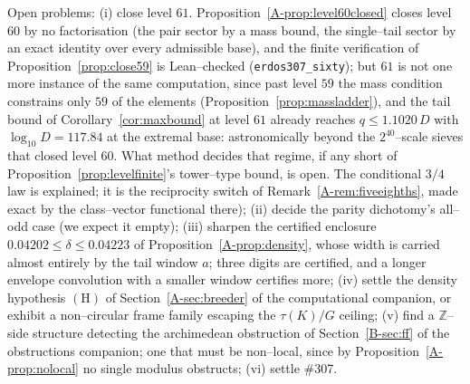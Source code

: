\documentclass[11pt]{article}
\theoremstyle{definition}
\begin{document}
Open problems: (i) close level $61$. Proposition~\ref{A-prop:level60closed} closes level $60$ by no factorisation
(the pair sector by a mass bound, the single--tail sector by an exact identity over every admissible base), and the
finite verification of Proposition~\ref{prop:close59} is Lean--checked (\texttt{erdos307\_sixty}); but $61$ is not one
more instance of the same computation, since past level $59$ the mass condition constrains only $59$ of the elements
(Proposition~\ref{prop:massladder}), and the tail bound of Corollary~\ref{cor:maxbound} at level $61$ already reaches
$q\le1.1020\,D$ with $\log_{10}D=117.84$ at the extremal base: astronomically beyond the $2^{40}$--scale sieves that
closed level $60$. What method decides that regime, if any short of Proposition~\ref{prop:levelfinite}'s tower--type
bound, is open. The conditional $3/4$
law is explained; it is the reciprocity switch of Remark~\ref{A-rem:fiveeighths}, made exact by
the class--vector functional there); (ii) decide
the parity dichotomy's all--odd case (we expect it empty); (iii) sharpen the certified enclosure
$0.04202\le\delta\le0.04223$ of Proposition~\ref{A-prop:density}, whose width is carried almost
entirely by the tail window $a$; three digits are certified, and a longer envelope convolution
with a smaller window certifies more; (iv) settle the density hypothesis $(\mathrm{H})$ of
Section~\ref{A-sec:breeder} of the computational companion, or exhibit a non--circular frame family escaping the $\tau(K)/G$ ceiling;
(v) find a $\mathbb{Z}$--side structure detecting the archimedean obstruction of
Section~\ref{B-sec:ff} of the obstructions companion; one that must be non--local, since by Proposition~\ref{A-prop:nolocal} no single
modulus obstructs; (vi) settle \#307.
\end{document}

